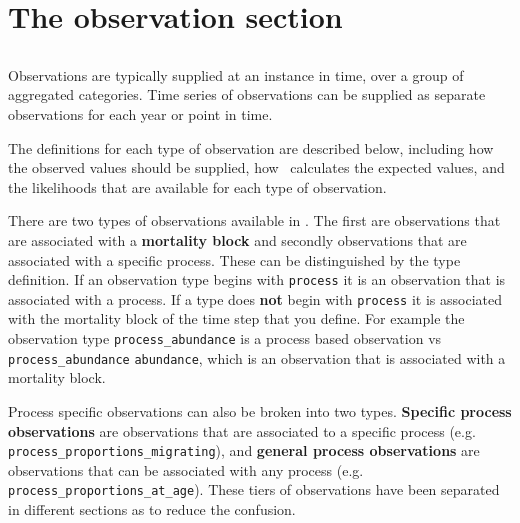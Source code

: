 \section{The observation section\label{sec:observation-section}}

\subsection{\label{sec:Observations}}

Observations are typically supplied at an instance in time, over a group of aggregated categories. Time series of observations can be supplied as separate observations for each year or point in time. 

The definitions for each type of observation are described below, including how the observed values should be supplied, how \CNAME\ calculates the expected values, and the likelihoods that are available for each type of observation.

There are two types of observations available in \CNAME. The first are observations that are associated with a \textbf{mortality block} and secondly observations that are associated with a specific process. These can be distinguished by the type definition. If an observation type begins with \texttt{process} it is an observation that is associated with a process. If a type does \textbf{not} begin with \texttt{process} it is associated with the mortality block of the time step that you define. For example the observation type \texttt{process\_abundance} is a process based observation vs \texttt{process\_abundance} \texttt{abundance}, which is an observation that is associated with a mortality block.

Process specific observations can also be broken into two types. \textbf{Specific process observations} are observations that are associated to a specific process (e.g. \texttt{process\_proportions\_migrating}), and \textbf{general process observations} are observations that can be associated with any process (e.g. \texttt{process\_proportions\_at\_age}). These tiers of observations have been separated in different sections as to reduce the confusion.

\subsubsection{}

